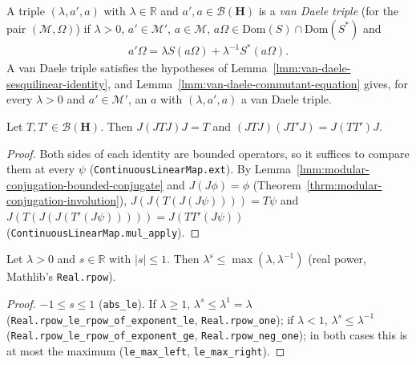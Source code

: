 \begin{definition}
    \label{def:van-daele-triple}
    \leanok
    A triple $(\lambda, a', a)$ with $\lambda \in \mathbb{R}$ and $a', a \in \mathcal{B}(\mathbf{H})$ is a \emph{van Daele triple} (for the pair $(\mathcal{M}, \Omega)$) if $\lambda > 0$, $a' \in \mathcal{M}'$, $a \in \mathcal{M}$, $a\Omega \in \text{Dom}(S) \cap \text{Dom}(S^*)$ and
    \begin{align}
        a'\Omega = \lambda S(a\Omega) + \lambda^{-1}S^*(a\Omega).
    \end{align}
    A van Daele triple satisfies the hypotheses of Lemma~\ref{lmm:van-daele-sesquilinear-identity}, and Lemma~\ref{lmm:van-daele-commutant-equation} gives, for every $\lambda > 0$ and $a' \in \mathcal{M}'$, an $a$ with $(\lambda, a', a)$ a van Daele triple.
\end{definition}

\begin{lemma}
    \label{lmm:modular-conjugation-bounded-conjugate-identities}
    \leanok
    Let $T, T' \in \mathcal{B}(\mathbf{H})$. Then $J(JTJ)J = T$ and $(JTJ)(JT'J) = J(TT')J$.
\end{lemma}
\begin{proof}
    \leanok
    Both sides of each identity are bounded operators, so it suffices to compare them at every $\psi$ (\texttt{ContinuousLinearMap.ext}). By Lemma~\ref{lmm:modular-conjugation-bounded-conjugate} and $J(J\phi) = \phi$ (Theorem~\ref{thrm:modular-conjugation-involution}), $J(J(T(J(J\psi)))) = T\psi$ and $J(T(J(J(T'(J\psi))))) = J(TT'(J\psi))$ (\texttt{ContinuousLinearMap.mul\_apply}).
\end{proof}

\begin{lemma}
    \label{lmm:van-daele-rpow-le-max}
    \leanok
    Let $\lambda > 0$ and $s \in \mathbb{R}$ with $|s| \le 1$. Then $\lambda^s \le \max(\lambda, \lambda^{-1})$ (real power, Mathlib's \texttt{Real.rpow}).
\end{lemma}
\begin{proof}
    \leanok
    $-1 \le s \le 1$ (\texttt{abs\_le}). If $\lambda \ge 1$, $\lambda^s \le \lambda^1 = \lambda$ (\texttt{Real.rpow\_le\_rpow\_of\_exponent\_le}, \texttt{Real.rpow\_one}); if $\lambda < 1$, $\lambda^s \le \lambda^{-1}$ (\texttt{Real.rpow\_le\_rpow\_of\_exponent\_ge}, \texttt{Real.rpow\_neg\_one}); in both cases this is at most the maximum (\texttt{le\_max\_left}, \texttt{le\_max\_right}).
\end{proof}

